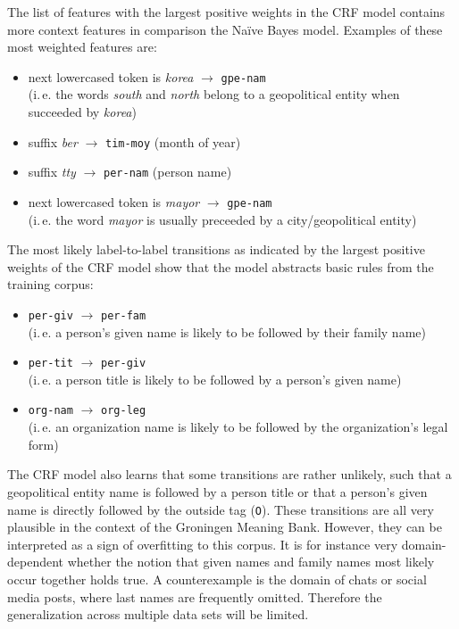 \documentclass[twocolumns]{IEEEtran}
\begin{document}
The list of features with the largest positive weights in the CRF model contains more context features in comparison the Na\"ive Bayes model. Examples of these most weighted features are:

\vspace*{2mm}
\begin{itemize}
    \item next lowercased token is \textit{korea} $\longrightarrow$ \texttt{gpe-nam} \\
        (i.\,e. the words \textit{south} and \textit{north} belong to a geopolitical entity when succeeded by \textit{korea})
    \item suffix \textit{ber} $\longrightarrow$ \texttt{tim-moy} (month of year)
    \item suffix \textit{tty} $\longrightarrow$ \texttt{per-nam} (person name)
    \item next lowercased token is \textit{mayor} $\rightarrow$ \texttt{gpe-nam} \\
        (i.\,e. the word \textit{mayor} is usually preceeded by a city/geopolitical entity)
\end{itemize}
\vspace*{2mm}

The most likely label-to-label transitions as indicated by the largest positive weights of the CRF model show that the model abstracts basic rules from the training corpus:

\vspace*{2mm}
\begin{itemize}
    \item \texttt{per-giv} $\longrightarrow$ \texttt{per-fam} \\
        (i.\,e. a person's given name is likely to be followed by their family name)
    \item \texttt{per-tit} $\longrightarrow$ \texttt{per-giv} \\
        (i.\,e. a person title is likely to be followed by a person's given name)
    \item \texttt{org-nam} $\longrightarrow$ \texttt{org-leg} \\
        (i.\,e. an organization name is likely to be followed by the organization's legal form)
\end{itemize}
\vspace*{2mm}

The CRF model also learns that some transitions are rather unlikely, such that a geopolitical entity name is followed by a person title or that a person's given name is directly followed by the outside tag (\texttt{O}). These transitions are all very plausible in the context of the Groningen Meaning Bank. However, they can be interpreted as a sign of overfitting to this corpus. It is for instance very domain-dependent whether the notion that given names and family names most likely occur together holds true. A counterexample is the domain of chats or social media posts, where last names are frequently omitted. Therefore the generalization across multiple data sets will be limited.
\end{document}
